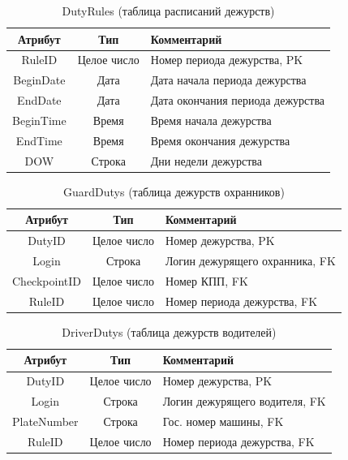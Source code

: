 \begin{table}[h!]
	\begin{center}
		\caption{DutyRules (таблица расписаний дежурств)}
		\label{dutyrule_table}
		\begin{tabular}{| c | c | p{8cm} |}
			\hline
			\textbf{Атрибут}		&	\textbf{Тип}		& \textbf{Комментарий} \\
			\hline
			RuleID		&	Целое число	&	Номер периода дежурства, PK \\ \hline
			BeginDate 	&	Дата		&	Дата начала периода дежурства \\ \hline
			EndDate 	&	Дата		&	Дата окончания периода дежурства \\ \hline
			BeginTime 	&	Время		&	Время начала дежурства \\ \hline
			EndTime 	&	Время		&	Время окончания дежурства \\ \hline
			DOW 		&	Строка		&	Дни недели дежурства \\ \hline
		\end{tabular}
	\end{center}
\end{table}

\begin{table}[h!]
	\begin{center}
		\caption{GuardDutys (таблица дежурств охранников)}
		\label{gduty_table}
		\begin{tabular}{| c | c | p{8cm} |}
			\hline
			\textbf{Атрибут}		&	\textbf{Тип}		& \textbf{Комментарий} \\
			\hline
			DutyID		&	Целое число	&	Номер дежурства, PK \\ \hline
			Login 		&	Строка		&	Логин дежурящего охранника, FK \\ \hline
			CheckpointID &	Целое число	&	Номер КПП, FK \\ \hline
			RuleID		&	Целое число	&	Номер периода дежурства, FK \\ \hline
		\end{tabular}
	\end{center}
\end{table}

\begin{table}[h!] 
	\begin{center}
		\caption{DriverDutys (таблица дежурств водителей)}
		\label{dduty_table}
		\begin{tabular}{| c | c | p{8cm} |}
			\hline
			\textbf{Атрибут}		&	\textbf{Тип}		& \textbf{Комментарий} \\
			\hline
			DutyID		&	Целое число	&	Номер дежурства, PK \\ \hline
			Login 		&	Строка		&	Логин дежурящего водителя, FK \\ \hline
			PlateNumber &	Строка		&	Гос. номер машины, FK \\ \hline
			RuleID		&	Целое число	&	Номер периода дежурства, FK \\ \hline
		\end{tabular}
	\end{center}
\end{table}

